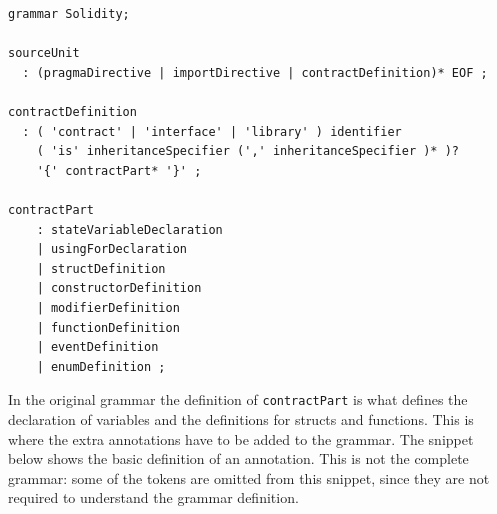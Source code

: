 \documentclass[a4paper]{article}
\begin{document}
\begin{lstlisting}[basicstyle=\ttfamily]
grammar Solidity;

sourceUnit
  : (pragmaDirective | importDirective | contractDefinition)* EOF ;

contractDefinition
  : ( 'contract' | 'interface' | 'library' ) identifier
    ( 'is' inheritanceSpecifier (',' inheritanceSpecifier )* )?
    '{' contractPart* '}' ;

contractPart
    : stateVariableDeclaration
    | usingForDeclaration
    | structDefinition
    | constructorDefinition
    | modifierDefinition
    | functionDefinition
    | eventDefinition
    | enumDefinition ;
\end{lstlisting}
In the original grammar the definition of \texttt{contractPart} is what defines the declaration of variables and the definitions for structs and functions. This is where the extra annotations have to be added to the grammar. The snippet below shows the basic definition of an annotation. This is not the complete grammar: some of the tokens are omitted from this snippet, since they are not required to understand the grammar definition.
\end{document}
